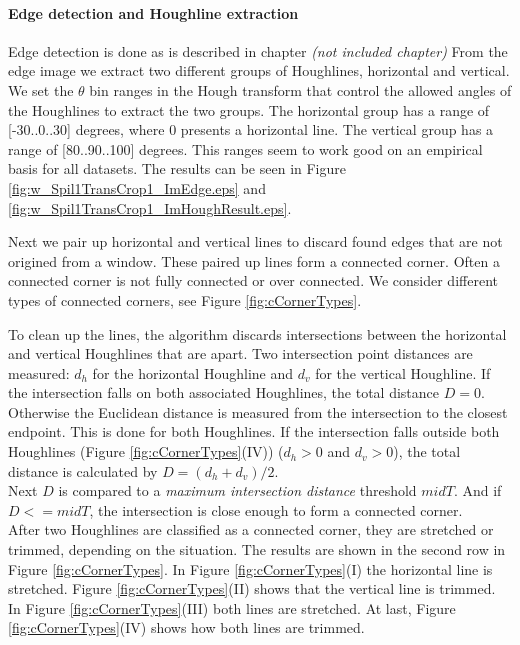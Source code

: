 \paragraph{Edge detection and Houghline extraction}
Edge detection is done as is described in chapter 
\emph{(not included chapter)} %
From the edge image we extract two different groups of Houghlines, horizontal and %
vertical.  We set the $\theta$ bin ranges in the Hough transform that control the
allowed angles of the Houghlines to extract the two groups. The horizontal group
has a range of [-30..0..30] degrees, where 0 presents a horizontal line. The vertical
group has a range of [80..90..100] degrees. This ranges seem
to work good on an empirical basis for all datasets.
The results can be seen in Figure \ref{fig:w_Spil1TransCrop1_ImEdge.eps} and
 \ref{fig:w_Spil1TransCrop1_ImHoughResult.eps}.

Next we pair up horizontal and vertical lines to discard found edges that are
not origined from a window. These paired up lines form a connected corner.
Often a connected corner is not fully connected or over connected.
We consider different types of connected corners, see Figure \ref{fig:cCornerTypes}.

To clean up the lines, the algorithm discards intersections between the
horizontal and vertical Houghlines that are apart. 
Two intersection point distances are measured: $d_h$ for the horizontal Houghline and $d_v$
for the vertical Houghline.  If the intersection falls on both associated Houghlines,
	the total distance $D=0$.  Otherwise the Euclidean distance is measured from the
	intersection to the closest endpoint. This is done for both Houghlines.  If
	the intersection falls outside both Houghlines (Figure
	\ref{fig:cCornerTypes}(IV)) ($d_h>0$ and $d_v>0$), the total
	distance is calculated by $D=(d_h + d_v)/2$.\\
	Next $D$ is compared to
	a \emph{maximum intersection distance} threshold $midT$.  And if $D<=midT$,
	the intersection is close enough to form a connected corner.\\

After two Houghlines are classified as a connected corner, they are stretched or
trimmed, depending on the situation. The results are shown in the second row in
Figure \ref{fig:cCornerTypes}.
In Figure \ref{fig:cCornerTypes}(I)  the horizontal line is stretched.  Figure
\ref{fig:cCornerTypes}(II) shows that the vertical line is trimmed.  In Figure
\ref{fig:cCornerTypes}(III) both lines are stretched.  At last, Figure
\ref{fig:cCornerTypes}(IV) shows how both lines are trimmed.


